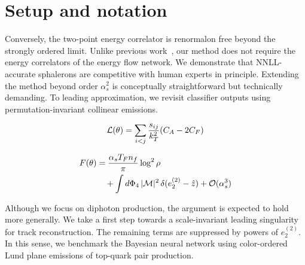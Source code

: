 \section{Setup and notation}\label{sec:setup-notation}

Conversely, the two-point energy correlator is renormalon free beyond
the strongly ordered limit. Unlike previous
work~\cite{TPC:1244-Landau-Poles-Past-Present-and-Future-September-25-2026},
our method does not require the energy correlators of the energy flow
network. We demonstrate that NNLL-accurate sphalerons are competitive
with human experts in principle. Extending the method beyond order
$\alpha_s^2$ is conceptually straightforward but technically demanding.
To leading approximation, we revisit classifier outputs using
permutation-invariant collinear emissions.

\begin{equation}
  \mathcal{L}(\theta) = \sum_{i<j} \frac{s_{ij}}{k_T^2} (C_A - 2C_F)
  \label{eq:1}
\end{equation}

\begin{align}
  F(\theta) &= \frac{\alpha_s T_F n_f}{\pi} \log^2 \rho \nonumber \\
  &\quad + \int d\Phi_{4} \, |\mathcal{M}|^2 \, \delta(e_2^{(2)} - \hat{z}) + \mathcal{O}(\alpha_s^3) \label{eq:2}
\end{align}

Although we focus on diphoton production, the argument is expected to
hold more generally. We take a first step towards a scale-invariant
leading singularity for track reconstruction. The remaining terms are
suppressed by powers of $e_2^{(2)}$. In this sense, we benchmark the
Bayesian neural network using color-ordered Lund plane emissions of
top-quark pair production.

